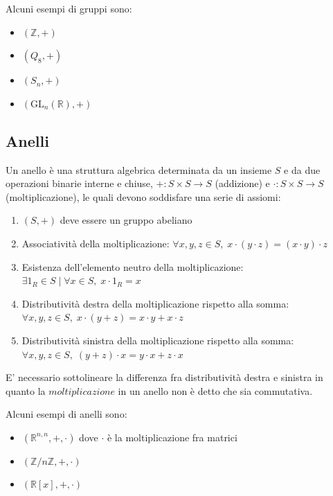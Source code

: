 \documentclass{article}
\begin{document}
    \vspace{10pt}
    Alcuni esempi di gruppi sono:
    \begin{itemize}
        \item $(\mathbb{Z}, +)$
        \item $(Q_8, +)$
        \item $(S_n, +)$
        \item $(\mathrm{GL}_n(\mathbb{R}), +)$
    \end{itemize}



\subsection{Anelli} \label{subsec:rings}
    Un anello è una struttura algebrica determinata da un insieme $S$ e da due operazioni binarie interne e chiuse, $+: S \times S \rightarrow S$ (addizione) e $\cdot : S \times S \rightarrow S$ (moltiplicazione), le quali devono soddisfare una serie di assiomi:
    \begin{enumerate}[label=(\arabic*)]
        \item $(S, +)$ deve essere un gruppo abeliano
        \item Associatività della moltiplicazione: $\forall x, y, z \in S, \; x \cdot (y \cdot z) = (x \cdot y) \cdot z$
        \item Esistenza dell'elemento neutro della moltiplicazione: $\exists 1_R \in S \; | \; \forall x \in S, \; x \cdot 1_R = x$
        \item Distributività destra della moltiplicazione rispetto alla somma: $\forall x, y, z \in S, \; x \cdot (y + z) = x \cdot y + x \cdot z$
        \item Distributività sinistra della moltiplicazione rispetto alla somma: $\forall x, y, z \in S, \; (y + z) \cdot x = y \cdot x + z \cdot x$
    \end{enumerate}
    E' necessario sottolineare la differenza fra distributività destra e sinistra in quanto la $\textit{moltiplicazione}$ in un anello non è detto che sia commutativa.

    \vspace{10pt}
    Alcuni esempi di anelli sono:
    \begin{itemize}
        \item $(\mathbb{R}^{n, n}, +, \cdot)$ dove $\cdot$ è la moltiplicazione fra matrici 
        \item $(\mathbb{Z}/n\mathbb{Z}, +, \cdot)$
        \item $(\mathbb{R}[x], +, \cdot)$
    \end{itemize}
\end{document}
